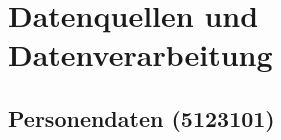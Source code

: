 \section{Datenquellen und Datenverarbeitung}
	\subsection{Personendaten (5123101)}

	\cite{swain_synthetic_person_data}
